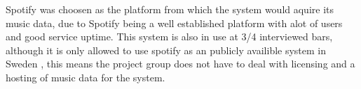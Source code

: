 Spotify was choosen as the platform from which the system would aquire its music data, due to Spotify being a well established platform with alot of users and good service uptime. This system is also in use at 3/4 interviewed bars, although it is only allowed to use spotify as an publicly availible system in Sweden \cite{spotifyBusiness}, this means the project group does not have to deal with licensing and a hosting of music data for the system.